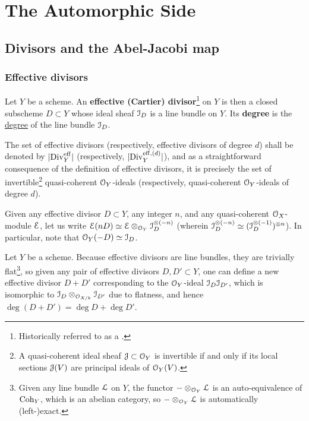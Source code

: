 \section{The Automorphic Side}
    \subsection{Divisors and the Abel-Jacobi map}
        \subsubsection{Effective divisors}
            \begin{definition}[Divisors] \label{def: divisors}
                Let $Y$ be a scheme. An \textbf{effective (Cartier) divisor}\footnote{Historically referred to as a .} on $Y$ is then a closed subscheme $D \subset Y$ whose ideal sheaf $\mathcal{I}_D$ is a line bundle on $Y$. Its \textbf{degree} is the \href{https://stacks.math.columbia.edu/tag/0AYQ}{\underline{degree}} of the line bundle $\mathcal{I}_D$.  
            \end{definition}
            
            \begin{convention}
                The set of effective divisors (respectively, effective divisors of degree $d$) shall be denoted by $|\mathrm{Div}_Y^{\mathrm{eff}}|$ (respectively, $|\mathrm{Div}_Y^{\mathrm{eff}, (d)}|$), and as a straightforward consequence of the definition of effective divisors, it is precisely the set of invertible\footnote{A quasi-coherent ideal sheaf $\mathcal{J} \subset \mathcal{O}_Y$ is invertible if and only if its local sections $\mathcal{J}(V)$ are principal ideals of $\mathcal{O}_Y(V)$.} quasi-coherent $\mathcal{O}_Y$-ideals (respectively, quasi-coherent $\mathcal{O}_Y$-ideals of degree $d$).
            \end{convention}
            \begin{convention}
                Given any effective divisor $D \subset Y$, any integer $n$, and any quasi-coherent $\mathcal{O}_X$-module $\mathcal{E}$, let us write $\E(nD) \cong \E \tensor_{\calO_Y} \calI_D^{\tensor (-n)}$ (wherein $\calI_D^{\tensor (-n)} \cong (\calI_D^{\tensor (-1)})^{\tensor n}$). In particular, note that $\mathcal{O}_Y(-D) \simeq \mathcal{I}_D$.
            \end{convention}
            \begin{remark} \label{remark: adding_effective_divisors}
                Let $Y$ be a scheme. Because effective divisors are line bundles, they are trivially flat\footnote{Given any line bundle $\mathcal{L}$ on $Y$, the functor $- \tensor_{\calO_Y} \calL$ is an auto-equivalence of $\mathrm{Coh}_Y$, which is an abelian category, so $- \tensor_{\calO_Y} \calL$ is automatically (left-)exact.}, so given any pair of effective divisors $D, D' \subset Y$, one can define a new effective divisor $D + D'$ corresponding to the $\mathcal{O}_Y$-ideal $\mathcal{I}_D \mathcal{I}_{D'}$, which is isomorphic to $\calI_D \tensor_{\calO_{X/k}} \calI_{D'}$ due to flatness, and hence $\deg(D + D') = \deg D + \deg D'$.
            \end{remark}
            
